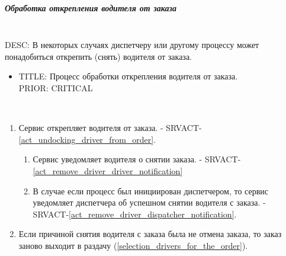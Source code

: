 \subparagraph{Обработка открепления водителя от заказа} \label{remove_driver_from_order} \mbox{}\\

  DESC: В некоторых случаях диспетчеру или другому процессу может понадобиться открепить (снять) водителя от заказа. 

  \begin{itemize}

   \item {
      TITLE: Процесс обработки открепления водителя от заказа.
      \\
      PRIOR: CRITICAL\\
   }

   \end{itemize}


    	\begin{alg}  \label{remove_driver_from_order_alg} \mbox{}\\

        \begin{enumerate}

          \item Сервис открепляет водителя от заказа. - SRVACT-\ref{act_undocking_driver_from_order}.

          \begin{enumerate}

            \item Сервис уведомляет водителя о снятии заказа. - SRVACT-\ref{act_remove_driver_driver_notification} 
            
            \item В случае если процесс был инициирован диспетчером, то сервис уведомляет диспетчера об успешном снятии водителя с заказа. -  SRVACT-\ref{act_remove_driver_dispatcher_notification}.

          \end{enumerate}
          
          \item Если причиной снятия водителя с заказа была не отмена заказа, то заказ заново выходит в раздачу (\ref{selection_drivers_for_the_order}).

        \end{enumerate}
      \end{alg}